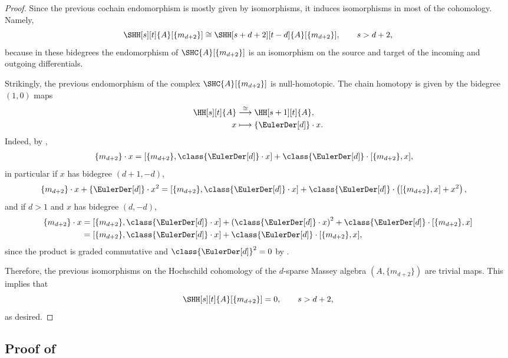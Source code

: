 \documentclass[a4paper]{amsart}
\begin{document}
\begin{proof}
  Since the previous cochain endomorphism is mostly given by isomorphisms, it induces isomorphisms in most of the cohomology. Namely,
  \[\SHH[s][t]{A}[\{m_{d+2}\}]\cong \SHH[s+d+2][t-d]{A}[\{m_{d+2}\}],\qquad s> d+2,\]
  because in these bidegrees the endomorphism of $\SHC{A}[\{m_{d+2}\}]$ is an isomorphism on the source and target of the incoming and outgoing differentials.

  Strikingly, the previous endomorphism of the complex $\SHC{A}[\{m_{d+2}\}]$ is  null-homotopic. The chain homotopy is given by the bidegree $(1,0)$ maps
  \begin{align*}
    \HH[s][t]{A}&\stackrel{\cong}{\longrightarrow}\HH[s+1][t]{A},\\
    x&\longmapsto \{\EulerDer[d]\}\cdot x.
  \end{align*}
  Indeed, by ,
  \begin{align*}
    \{m_{d+2}\}\cdot x                                                  & =[\{m_{d+2}\},\class{\EulerDer[d]}\cdot x]+\class{\EulerDer[d]}\cdot[\{m_{d+2}\},x],
  \end{align*}
  in particular if $x$ has bidegree $(d+1,-d)$,
  \begin{align*}
    \{m_{d+2}\}\cdot x+\{\EulerDer[d]\}\cdot x^2                                                  & =[\{m_{d+2}\},\class{\EulerDer[d]}\cdot x]+\class{\EulerDer[d]}\cdot\left([\{m_{d+2}\},x]+x^2\right),
  \end{align*}
  and if $d>1$ and $x$ has bidegree $(d,-d)$,
  \begin{align*}
    \{m_{d+2}\}\cdot x                                                  & =[\{m_{d+2}\},\class{\EulerDer[d]}\cdot x]+\left(\class{\EulerDer[d]}\cdot x\right)^2+\class{\EulerDer[d]}\cdot[\{m_{d+2}\},x]\\
    & =[\{m_{d+2}\},\class{\EulerDer[d]}\cdot x]+\class{\EulerDer[d]}\cdot[\{m_{d+2}\},x],
  \end{align*}
  since the product is graded commutative and $\class{\EulerDer[d]}^2=0$ by .

  Therefore, the previous isomorphisms on the Hochschild cohomology of the $d$-sparse Massey algebra $(A,\{m_{d+2}\})$ are trivial maps. This implies that 
  \[\SHH[s][t]{A}[\{m_{d+2}\}]=0,\qquad s> d+2,\]
  as desired.
\end{proof}

\subsection{Proof of }
\label{subsec:thmA-Ainfty-version}
\end{document}

